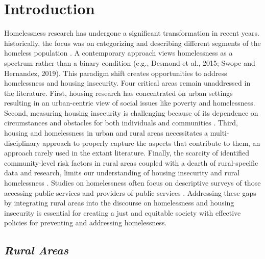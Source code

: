 \chapter{Introduction} 

Homelessness research has undergone a significant transformation in recent years. historically, the focus was on categorizing and describing different segments of the homeless population \citep{lee_homelessness_2021}. A contemporary approach views homelessness as a spectrum rather than a binary condition (e.g., Desmond et al., 2015; Swope and Hernandez, 2019). This paradigm shift creates opportunities to address homelessness and housing insecurity. Four critical areas remain unaddressed in the literature. First, housing research has concentrated on urban settings resulting in an urban-centric view of social issues like poverty and homelessness. Second, measuring housing insecurity is challenging because of its dependence on circumstances and obstacles for both individuals and communities \citep{leifheit_building_2022}. Third, housing and homelessness in urban and rural areas necessitates a multi-disciplinary approach to properly capture the aspects that contribute to them, an approach rarely used in the extant literature.  Finally, the scarcity of identified community-level risk factors in rural areas coupled with a dearth of rural-specific data and research, limits our understanding of housing insecurity and rural homelessness \citep{gleason_using_2021}. Studies on homelessness often focus on descriptive surveys of those accessing public services and providers of public services \citep{robertson_rural_2007}. Addressing these gaps by integrating rural areas into the discourse on homelessness and housing insecurity is essential for creating a just and equitable society with effective policies for preventing and addressing homelessness\citep{oregan_how_2021}.

\section{\textit{Rural Areas}}


